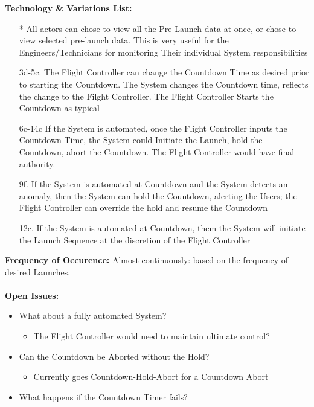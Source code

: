 \documentclass[letterpaper]{article}
\begin{document}
\textbf{Technology \& Variations List: }
\begin{itemize}
\item[*] All actors can chose to view all the Pre-Launch data at once,
or chose to view selected pre-launch data.  This is very useful for the
Engineers/Technicians for monitoring Their individual System
responsibilities
\item[3d-5c.]The Flight Controller can change the Countdown Time as
desired prior to starting the Countdown.  The System changes the
Countdown time, reflects the change to the Filght Controller.  The
Flight Controller Starts the Countdown as typical
\item [6c-14c]If the System is automated, once the Flight Controller 
inputs the Countdown Time, the System could Initiate the Launch, 
hold the Countdown, abort the Countdown.  The Flight Controller would
have final authority.
\item[9f.] If the System is automated at Countdown and the System
detects an anomaly, then the System can hold the Countdown, alerting
the Users;  the Flight Controller can override the hold and resume the
Countdown
\item[12c.] If the System is automated at Countdown, them the System
will initiate the Launch Sequence at the discretion of the Flight
Controller
\end{itemize}
\textbf{Frequency of Occurence:  }  Almost continuously:  based on the
frequency of desired Launches.\\\\
\textbf{Open Issues:  }
\begin{itemize}
\item What about a fully automated System?
\begin{itemize}
\item The Flight Controller would need to maintain ultimate control?
\end{itemize}
\item Can the Countdown be Aborted without the Hold?
\begin{itemize}
\item Currently goes Countdown-Hold-Abort for a Countdown Abort
\end{itemize}
\item What happens if the Countdown Timer fails?
\end{itemize}
\end{document}
